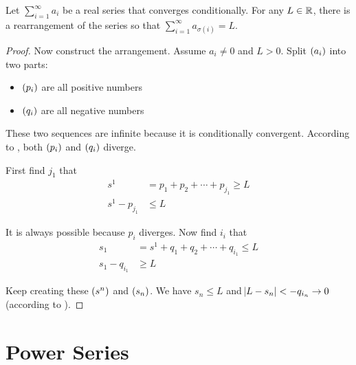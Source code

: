 \begin{theorem}
    Let $\sum_{i=1}^\infty a_i$ be a real series that converges conditionally. For any $L \in \mathbb{R}$, there is a rearrangement of the series so that $\sum_{i=1}^\infty a_{\sigma (i)} = L$.
\end{theorem}
\begin{proof}
    
    Now construct the arrangement. Assume $a_i \neq 0$ and $L > 0$. Split $\sequence{a_i}$ into two parts:
    \begin{itemize}
        \item $\sequence{p_i}$ are all positive numbers
        \item $\sequence{q_i}$ are all negative numbers
    \end{itemize}
    
    These two sequences are infinite because it is conditionally convergent. According to , both $\sequence{p_i}$ and $\sequence{q_i}$ diverge. 
    
    First find $j_1$ that
    \begin{equation*}
        \begin{aligned}
            s^1 &= p_1 + p_2 + \cdots + p_{j_1} \geq L \\
            s^1 - p_{j_1} &\leq L
        \end{aligned}
    \end{equation*}
    
    It is always possible because $p_i$ diverges. Now find $i_i$ that
    \begin{equation*}
        \begin{aligned}
            s_1 &= s^1 + q_1 + q_2 + \cdots + q_{i_1} \leq L \\
            s_1 - q_{i_1} &\geq L
        \end{aligned}
    \end{equation*}
    
    Keep creating these $\sequence{s^n}$ and $\sequence{s_n}$. We have $s_n \leq L$ and $\abs{L - s_n} < - q_{i_n} \rightarrow 0$ (according to ).
\end{proof}






\section{Power Series}

